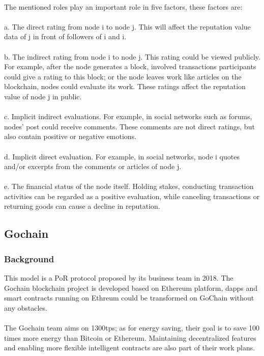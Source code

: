 \documentclass[]{article}
\begin{document}
\begin{CJK*}{UTF8}{gbsn}
	\paragraph{}
	The mentioned roles play an important role in five factors, these factors are:
\\\\
	a. The direct rating from node i to node j. This will affect the reputation value data of j in front of followers of i and i.\\\\
	b. The indirect rating from node i to node j. This rating could be viewed publicly. For example, after the node generates a block, involved transactions participants could give a rating to this block; or the node leaves work like articles on the blockchain, nodes could evaluate its work. These ratings affect the reputation value of node j in public.\\\\
	c. Implicit indirect evaluations. For example, in social networks such as forums, nodes' post could receive comments. These comments are not direct ratings, but also contain positive or negative emotions.\\\\
	d. Implicit direct evaluation. For example, in social networks, node i quotes and/or excerpts from the comments or articles of node j.\\\\
	e. The financial status of the node itself. Holding stakes, conducting transaction activities can be regarded as a positive evaluation, while canceling transactions or returning goods can cause a decline in reputation.
	
\subsection{Gochain} 
\subsubsection*{Background} 
	This model is a PoR protocol proposed by its business team in 2018. The Gochain blockchain project is developed based on Ethereum platform, dapps and smart contracts running on Ethreum could be transformed on GoChain without any obstacles.
	\paragraph{} 
	The Gochain team aims on 1300tps; as for energy saving, their goal is to save 100 times more energy than Bitcoin or Ethereum. Maintaining decentralized features and enabling more flexible intelligent contracts are also part of their work plans.

\end{CJK*}
\end{document}
